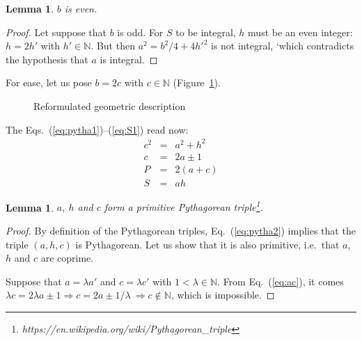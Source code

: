 \documentclass[11pt, a4paper]{article}
\newtheorem{lemma}[theorem]{Lemma}
\newcommand{\Figure}[1]{Figure~\ref{#1}}
\newcommand{\Eq}[1]{Eq.~(\ref{#1})}
\newcommand{\Eqs}[2]{Eqs.~(\ref{#1})--(\ref{#2})}
\newcommand{\set}[1]{\mathbb{#1}}
\begin{document}
\begin{lemma}$b$ is even.\end{lemma}
\begin{proof} Let suppose that $b$ is odd. For $S$ to be integral, $h$ must be an even integer: $h=2h'$ with $h'\in\set N$. But then $a^2 = b^2/4 + 4h'^2$ is not integral, `which contradicts the hypothesis that $a$ is integral.
\end{proof}

For ease, let us pose $b=2c$ with $c\in\set N$ (\Figure{fig:triangle2}). 
\begin{figure}
    \begin{center}
        \caption{Reformulated geometric description}
        \label{fig:triangle2}
    \end{center}
\end{figure}

The \Eqs{eq:pytha1}{eq:S1} read now:
\begin{eqnarray}
c^2 & = & a^2 + h^2 \\ \label{eq:pytha2}
  c & = & 2a \pm 1 \\ \label{eq:ac}
  P & = & 2(a+c) \\ 
  S & = & ah \label{eq:S2}
\end{eqnarray}


\begin{lemma}$a$, $h$ and $c$ form a primitive Pythagorean triple\footnote{https://en.wikipedia.org/wiki/Pythagorean\_triple}.\end{lemma}

\begin{proof} 
	By definition of the Pythagorean triples, \Eq{eq:pytha2} implies that the triple $(a, h, c)$ is Pythagorean. Let us show that it is also primitive, i.e.\ that $a$, $h$ and $c$ are coprime.
		
	Suppose that $a=\lambda a'$ and $c=\lambda c'$ with $1<\lambda\in\set N$. From \Eq{eq:ac}, it comes $\lambda c = 2 \lambda a \pm 1 \Rightarrow c = 2 a \pm 1/\lambda\ \Rightarrow c \not\in\set N$, which is impossible. 
\end{proof}
\end{document}
